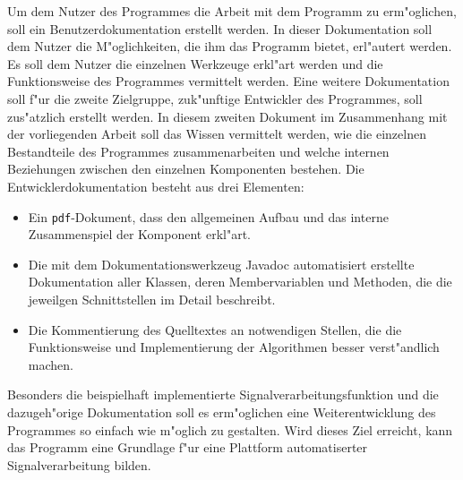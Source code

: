 Um dem Nutzer des Programmes die Arbeit mit dem Programm zu erm"oglichen, soll ein Benutzerdokumentation erstellt werden.
In dieser Dokumentation soll dem Nutzer die M"oglichkeiten, die ihm das Programm bietet, erl"autert werden.
Es soll dem Nutzer die einzelnen Werkzeuge erkl"art werden und die Funktionsweise des Programmes vermittelt werden.
Eine weitere Dokumentation soll f"ur die zweite Zielgruppe, zuk"unftige Entwickler des Programmes, soll zus"atzlich erstellt werden.
In diesem zweiten Dokument im Zusammenhang mit der vorliegenden Arbeit soll das Wissen vermittelt werden, wie die einzelnen Bestandteile des Programmes zusammenarbeiten und welche internen Beziehungen zwischen den einzelnen Komponenten bestehen.
Die Entwicklerdokumentation besteht aus drei Elementen:
\begin{itemize}
	\item Ein \verb|pdf|-Dokument, dass den allgemeinen Aufbau und das interne Zusammenspiel der Komponent erkl"art.
	\item Die mit dem Dokumentationswerkzeug Javadoc automatisiert erstellte Dokumentation aller Klassen, deren Membervariablen und Methoden, die die jeweilgen Schnittstellen im Detail beschreibt.
	\item Die Kommentierung des Quelltextes an notwendigen Stellen, die die Funktionsweise und Implementierung der Algorithmen besser verst"andlich machen.
\end{itemize}
Besonders die beispielhaft implementierte Signalverarbeitungsfunktion und die dazugeh"orige Dokumentation soll es erm"oglichen eine Weiterentwicklung des Programmes so einfach wie m"oglich zu gestalten.
Wird dieses Ziel erreicht, kann das Programm eine Grundlage f"ur eine Plattform automatiserter Signalverarbeitung bilden.

